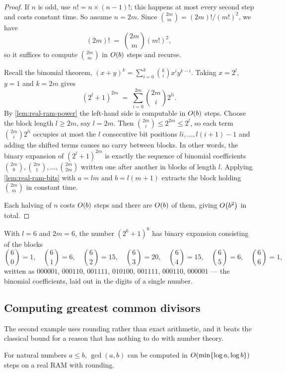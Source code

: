 \begin{proof}
If $n$ is odd, use $n! = n \times (n-1)!$; this happens at most every second
step and costs constant time. So assume $n = 2m$. Since
$\binom{2m}{m} = (2m)!/(m!)^2$, we have
\[ (2m)! \;=\; \binom{2m}{m} (m!)^2, \]
so it suffices to compute $\binom{2m}{m}$ in $O\!\left(b\right)$ steps and recurse.

Recall the binomial theorem, $(x+y)^k = \sum_{i=0}^{k} \binom{k}{i}x^i y^{k-i}$.
Taking $x = 2^l$, $y = 1$ and $k = 2m$ gives
\[ (2^l+1)^{2m} \;=\; \sum_{i=0}^{2m} \binom{2m}{i} 2^{li}. \]
By \cref{lem:real-ram-power} the left-hand side is computable in $O\!\left(b\right)$
steps. Choose the block length $l \ge 2m$, say $l = 2m$. Then
$\binom{2m}{i} \le 2^{2m} \le 2^l$, so each term $\binom{2m}{i}2^{li}$ occupies
at most the $l$ consecutive bit positions $li, \ldots, l(i+1)-1$ and adding the
shifted terms causes no carry between blocks. In other words, the binary
expansion of $(2^l+1)^{2m}$ is exactly the sequence of binomial coefficients
$\binom{2m}{0}, \binom{2m}{1}, \ldots, \binom{2m}{2m}$ written one after
another in blocks of length $l$. Applying \cref{lem:real-ram-bits} with
$a = lm$ and $b = l(m+1)$ extracts the block holding $\binom{2m}{m}$ in
constant time.

Each halving of $n$ costs $O\!\left(b\right)$ steps and there are $O\!\left(b\right)$ of them,
giving $O\!\left(b^2\right)$ in total.
\end{proof}

\begin{example}
With $l = 6$ and $2m = 6$, the number $(2^6+1)^6$ has binary expansion
consisting of the blocks
\[ \binom{6}{0} = 1,\quad \binom{6}{1} = 6,\quad \binom{6}{2} = 15,\quad
   \binom{6}{3} = 20,\quad \binom{6}{4} = 15,\quad \binom{6}{5} = 6,\quad
   \binom{6}{6} = 1, \]
written as $000001$, $000110$, $001111$, $010100$, $001111$, $000110$,
$000001$ --- the binomial coefficients, laid out in the digits of a single
number.
\end{example}

\subsection{Computing greatest common divisors}

The second example uses rounding rather than exact arithmetic, and it beats the
classical bound for a reason that has nothing to do with number theory.

\begin{lemma}\label{lem:real-ram-gcd}
For natural numbers $a \le b$, $\gcd(a,b)$ can be computed in
$O\!\left(\min\{\log a, \log b\}\right)$ steps on a real RAM with rounding.
\end{lemma}

